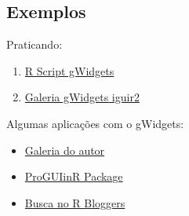 
\subsection{Exemplos}

\begin{frame}
  Praticando:
  \begin{enumerate}
  \item \href{run:./R/gWidgets/gWidgets.R}{R Script gWidgets}
  \item \href{run:gWidgets.html}{Galeria gWidgets iguir2}
  \end{enumerate}

  \vspace{0.5cm} Algumas aplicações com o gWidgets:
  \begin{itemize}
  \item
    \href{http://cran.r-project.org/web/packages/gWidgets/vignettes/}{Galeria
      do autor}
  \item \href{https://github.com/jverzani/ProgGUIinR}{ProGUIinR Package}
  \item \href{http://www.r-bloggers.com/?s=gWidgets}{Busca no R
      Bloggers}
  \end{itemize}
\end{frame}

